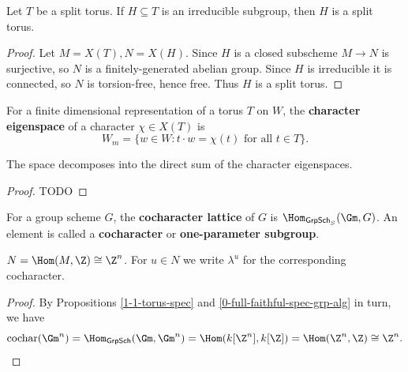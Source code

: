 \begin{proposition}
  \label{1-1-1-subgroup-subtorus}

  Let $T$ be a split torus.
  If $H \subseteq T$ is an irreducible subgroup, then $H$ is a split torus.
\end{proposition}
\begin{proof}

  Let $M = X(T), N=X(H)$. Since $H$ is a closed subscheme $M \to N$ is surjective,
  so $N$ is a finitely-generated abelian group. Since $H$ is irreducible it is connected,
  so $N$ is torsion-free, hence free. Thus $H$ is a split torus.
\end{proof}


\begin{definition}
  \label{1-1-char-eigenspace}

  For a finite dimensional representation of a torus $T$ on $W$, the {\bf character eigenspace} of a character $\chi \in X(T)$ is
  \[
    W_m = \{w\in W : t\cdot w = \chi(t)\text{ for all } t\in T \}.
  \]
\end{definition}


\begin{proposition}
  \label{1-1-2-char-eigenspace-direct-sum}

  The space decomposes into the direct sum of the character eigenspaces.
\end{proposition}
\begin{proof}
  \uses{}

  TODO
\end{proof}

\begin{definition}
  \label{1-1-cochar}
  \leanok

  For a group scheme $G$, the {\bf cocharacter lattice} of $G$ is $\Hom_{\mathsf{GrpSch}_S}(\Gm, G)$.
  An element is called a {\bf cocharacter} or {\bf one-parameter subgroup}.
\end{definition}

\begin{proposition}
  \label{1-1-cochar-torus}

  $N = \Hom(M, \Z) \cong \Z^n$. For $u \in N$ we write $\lambda^u$ for the corresponding cocharacter.
\end{proposition}
\begin{proof}

  By Propositions \ref{1-1-torus-spec} and \ref{0-full-faithful-spec-grp-alg} in turn, we have
  \[
    \mathrm{cochar}(\Gm^n) = \Hom_{\mathsf{GrpSch}}(\Gm, \Gm^n) = \Hom(k[\Z^n], k[\Z]) = \Hom(\Z^n, \Z) \cong \Z^n.
  \]
\end{proof}

